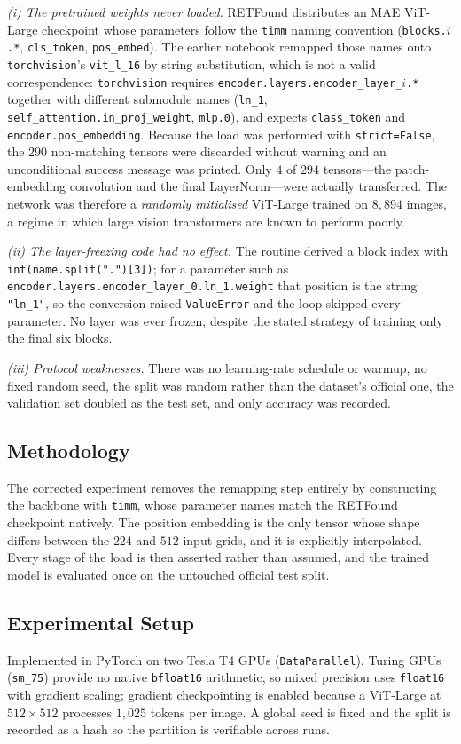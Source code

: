 \documentclass[journal,twoside,web]{ieeecolor}
\begin{document}
\emph{(i) The pretrained weights never loaded.} RETFound distributes an MAE ViT-Large
checkpoint whose parameters follow the \texttt{timm} naming convention
(\texttt{blocks.$i$.*}, \texttt{cls\_token}, \texttt{pos\_embed}). The earlier notebook
remapped those names onto \texttt{torchvision}'s \texttt{vit\_l\_16} by string
substitution, which is not a valid correspondence: \texttt{torchvision} requires
\texttt{encoder.layers.encoder\_layer\_$i$.*} together with different submodule names
(\texttt{ln\_1}, \texttt{self\_attention.in\_proj\_weight}, \texttt{mlp.0}), and expects
\texttt{class\_token} and \texttt{encoder.pos\_embedding}. Because the load was performed
with \texttt{strict=False}, the $290$ non-matching tensors were discarded without warning
and an unconditional success message was printed. Only $4$ of $294$ tensors---the
patch-embedding convolution and the final LayerNorm---were actually transferred. The
network was therefore a \emph{randomly initialised} ViT-Large trained on $8{,}894$
images, a regime in which large vision transformers are known to perform poorly.

\emph{(ii) The layer-freezing code had no effect.} The routine derived a block index with
\texttt{int(name.split(".")[3])}; for a parameter such as
\texttt{encoder.layers.encoder\_layer\_0.ln\_1.weight} that position is the string
\texttt{"ln\_1"}, so the conversion raised \texttt{ValueError} and the loop skipped every
parameter. No layer was ever frozen, despite the stated strategy of training only the
final six blocks.

\emph{(iii) Protocol weaknesses.} There was no learning-rate schedule or warmup, no fixed
random seed, the split was random rather than the dataset's official one, the validation
set doubled as the test set, and only accuracy was recorded.

\subsection{Methodology}
The corrected experiment removes the remapping step entirely by constructing the backbone
with \texttt{timm}, whose parameter names match the RETFound checkpoint natively. The
position embedding is the only tensor whose shape differs between the $224$ and $512$
input grids, and it is explicitly interpolated. Every stage of the load is then asserted
rather than assumed, and the trained model is evaluated once on the untouched official
test split.

\subsection{Experimental Setup}
Implemented in PyTorch on two Tesla T4 GPUs (\texttt{DataParallel}). Turing GPUs
(\texttt{sm\_75}) provide no native \texttt{bfloat16} arithmetic, so mixed precision uses
\texttt{float16} with gradient scaling; gradient checkpointing is enabled because a
ViT-Large at $512\times512$ processes $1{,}025$ tokens per image. A global seed is fixed
and the split is recorded as a hash so the partition is verifiable across runs.
\end{document}
